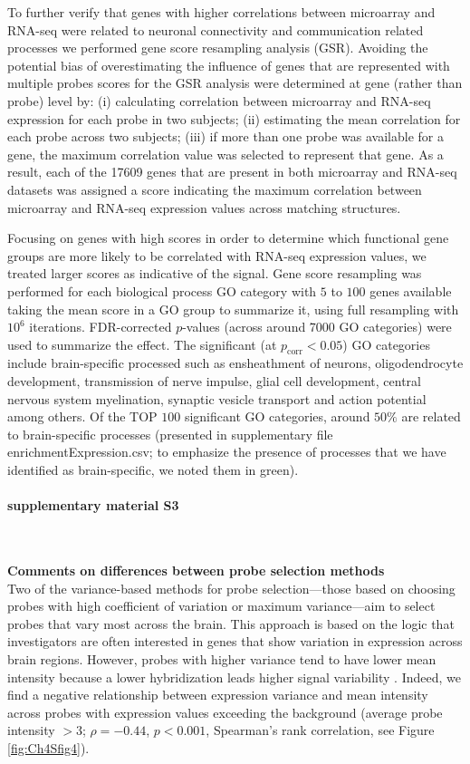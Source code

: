 \documentclass[10pt,A4]{article}
\begin{document}
To further verify that genes with higher correlations between microarray and RNA-seq were related to neuronal connectivity and communication related processes we performed gene score resampling analysis (GSR). Avoiding the potential bias of overestimating the influence of genes that are represented with multiple probes scores for the GSR analysis were determined at gene (rather than probe) level by: (i) calculating correlation between microarray and RNA-seq expression for each probe in two subjects; (ii) estimating the mean correlation for each probe across two subjects; (iii) if more than one probe was available for a gene, the maximum correlation value was selected to represent that gene. As a result, each of the \num{17609} genes that are present in both microarray and RNA-seq datasets was assigned a score indicating the maximum correlation between microarray and RNA-seq expression values across matching structures.

Focusing on genes with high scores in order to determine which functional gene groups are more likely to be correlated with RNA-seq expression values, we treated larger scores as indicative of the signal. Gene score resampling was performed for each biological process GO category with $5$ to $100$ genes available taking the mean score in a GO group to summarize it, using full resampling with $10^{6}$ iterations. FDR-corrected $p$-values (across around \num{7000} GO categories) were used to summarize the effect. The significant (at $p_\mathrm{corr}<0.05$) GO categories include brain-specific processed such as ensheathment of neurons, oligodendrocyte development, transmission of nerve impulse, glial cell development, central nervous system myelination, synaptic vesicle transport and action potential among others. Of the TOP $100$ significant GO categories, around $50\%$ are related to brain-specific processes (presented in supplementary file enrichmentExpression.csv; to emphasize the presence of processes that we have identified as brain-specific, we noted them in green).

\paragraph*{supplementary material S3}\mbox{}\\
\label{SItext3}

\textbf{Comments on differences between probe selection methods}\\
Two of the variance-based methods for probe selection—those based on choosing probes with high coefficient of variation or maximum variance—aim to select probes that vary most across the brain. This approach is based on the logic that investigators are often interested in genes that show variation in expression across brain regions. However, probes with higher variance tend to have lower mean intensity because a lower hybridization leads higher signal variability \citep{Quackenbush2002a}. Indeed, we find a negative relationship between expression variance and mean intensity across probes with expression values exceeding the background (average probe intensity $> 3$; $\rho = -0.44$, $p < 0.001$, Spearman’s rank correlation, see Figure \ref{fig:Ch4Sfig4}).
\end{document}
